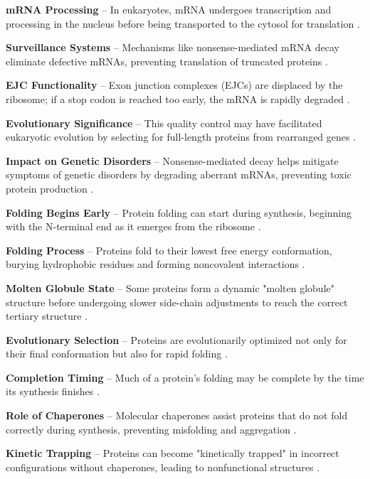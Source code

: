 \textbf{mRNA Processing} – In eukaryotes, mRNA undergoes transcription and processing in the nucleus before being transported to the cytosol for translation \cite*{L1-Chapter6}.

\textbf{Surveillance Systems} – Mechanisms like nonsense-mediated mRNA decay eliminate defective mRNAs, preventing translation of truncated proteins \cite*{L1-Chapter6}.

\textbf{EJC Functionality} – Exon junction complexes (EJCs) are displaced by the ribosome; if a stop codon is reached too early, the mRNA is rapidly degraded \cite*{L1-Chapter6}.

\textbf{Evolutionary Significance} – This quality control may have facilitated eukaryotic evolution by selecting for full-length proteins from rearranged genes \cite*{L1-Chapter6}.

\textbf{Impact on Genetic Disorders} – Nonsense-mediated decay helps mitigate symptoms of genetic disorders by degrading aberrant mRNAs, preventing toxic protein production \cite*{L1-Chapter6}.



\textbf{Folding Begins Early} – Protein folding can start during synthesis, beginning with the N-terminal end as it emerges from the ribosome \cite*{L1-Chapter6}.

\textbf{Folding Process} – Proteins fold to their lowest free energy conformation, burying hydrophobic residues and forming noncovalent interactions \cite*{L1-Chapter6}.

\textbf{Molten Globule State} – Some proteins form a dynamic "molten globule" structure before undergoing slower side-chain adjustments to reach the correct tertiary structure \cite*{L1-Chapter6}.

\textbf{Evolutionary Selection} – Proteins are evolutionarily optimized not only for their final conformation but also for rapid folding \cite*{L1-Chapter6}.

\textbf{Completion Timing} – Much of a protein's folding may be complete by the time its synthesis finishes \cite*{L1-Chapter6}.



\textbf{Role of Chaperones} – Molecular chaperones assist proteins that do not fold correctly during synthesis, preventing misfolding and aggregation \cite*{L1-Chapter6}.

\textbf{Kinetic Trapping} – Proteins can become "kinetically trapped" in incorrect configurations without chaperones, leading to nonfunctional structures \cite*{L1-Chapter6}.

